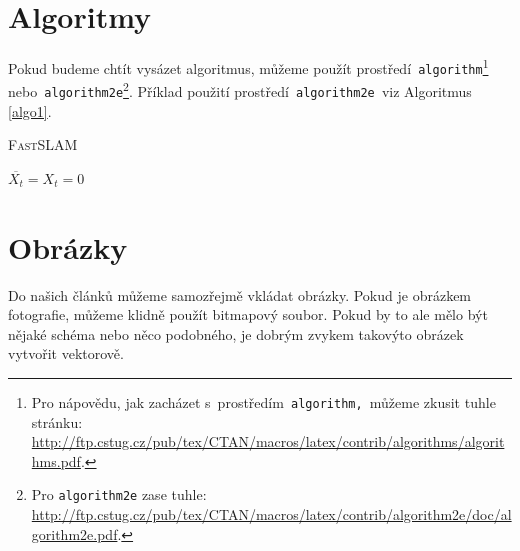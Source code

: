 \documentclass[a4paper, 11pt]{article}
\begin{document}
			\section{Algoritmy}\label{algoritmy}
			Pokud budeme chtít vysázet algoritmus, můžeme použít prostředí\texttt{ algorithm}\footnote{Pro nápovědu, jak zacházet s~prostředím\texttt{ algorithm, }můžeme zkusit tuhle stránku:\\\href{http://ftp.cstug.cz/pub/tex/CTAN/macros/latex/contrib/algorithms/algorithms.pdf}{http://ftp.cstug.cz/pub/tex/CTAN/macros/latex/contrib/algorithms/algorithms.pdf}.} nebo\texttt{ algorithm2e}\footnote{Pro \texttt{algorithm2e} zase tuhle: \href{http://ftp.cstug.cz/pub/tex/CTAN/macros/latex/contrib/algorithm2e/doc/algorithm2e.pdf}{http://ftp.cstug.cz/pub/tex/CTAN/macros/latex/contrib/algorithm2e/doc/algorithm2e.pdf}.}. Příklad použití prostředí\texttt{ algorithm2e }viz Algoritmus \ref*{algo1}.
			\begin{algorithm}\label{algo1}
				\caption{\textsc{FastSLAM}}
				\SetNlSty{}{\fontsize{9}{10}\selectfont}{:}
				\BlankLine
				\SetNlSkip{-0.55cm}
				\Indp \Indp
				$\overline{X_{t}}=X_{t}=0$ \\
			\end{algorithm}
						
			\section{Obrázky}
			Do našich článků můžeme samozřejmě vkládat obrázky. Pokud je obrázkem fotografie, můžeme klidně použít bitmapový soubor. Pokud by to ale mělo být nějaké schéma nebo něco podobného, je dobrým zvykem takovýto obrázek vytvořit vektorově.
						
\end{document}
